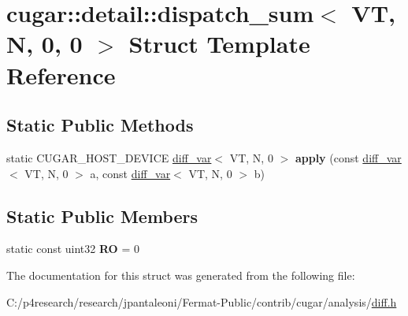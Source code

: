 \hypertarget{structcugar_1_1detail_1_1dispatch__sum_3_01_v_t_00_01_n_00_010_00_010_01_4}{}\section{cugar\+:\+:detail\+:\+:dispatch\+\_\+sum$<$ VT, N, 0, 0 $>$ Struct Template Reference}
\label{structcugar_1_1detail_1_1dispatch__sum_3_01_v_t_00_01_n_00_010_00_010_01_4}
\subsection*{Static Public Methods}
\begin{DoxyCompactItemize}
\item 
\mbox{\label{structcugar_1_1detail_1_1dispatch__sum_3_01_v_t_00_01_n_00_010_00_010_01_4_a19fac95557a9d1c064cfff1181632cdc}} 
static C\+U\+G\+A\+R\+\_\+\+H\+O\+S\+T\+\_\+\+D\+E\+V\+I\+CE \hyperlink{structcugar_1_1diff__var}{diff\+\_\+var}$<$ VT, N, 0 $>$ {\bfseries apply} (const \hyperlink{structcugar_1_1diff__var}{diff\+\_\+var}$<$ VT, N, 0 $>$ a, const \hyperlink{structcugar_1_1diff__var}{diff\+\_\+var}$<$ VT, N, 0 $>$ b)
\end{DoxyCompactItemize}
\subsection*{Static Public Members}
\begin{DoxyCompactItemize}
\item 
\mbox{\label{structcugar_1_1detail_1_1dispatch__sum_3_01_v_t_00_01_n_00_010_00_010_01_4_a8008e00fb8937c6cb5e4df84367e9659}} 
static const uint32 {\bfseries RO} = 0
\end{DoxyCompactItemize}


The documentation for this struct was generated from the following file\+:\begin{DoxyCompactItemize}
\item 
C\+:/p4research/research/jpantaleoni/\+Fermat-\/\+Public/contrib/cugar/analysis/\hyperlink{diff_8h}{diff.\+h}\end{DoxyCompactItemize}
